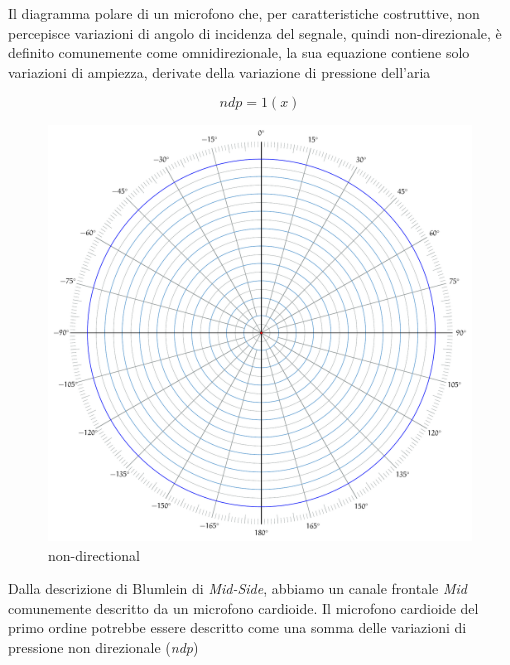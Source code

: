 Il diagramma polare di un microfono che, per caratteristiche costruttive, non
percepisce variazioni di angolo di incidenza del segnale, quindi non-direzionale,
è definito comunemente come omnidirezionale, la sua equazione contiene solo
variazioni di ampiezza, derivate della variazione di pressione dell'aria

\begin{equation}
ndp = 1(x)
\label{eq:omni}
\end{equation}

\begin{figure}[h]
\centering
\includegraphics[width=1\columnwidth]{CAPITOLI/_TIKZ/POLAR/omni}
\caption{non-directional}
\label{polar:omni}
\end{figure}


Dalla descrizione di Blumlein di \emph{Mid-Side}, abbiamo un canale frontale
\emph{Mid} comunemente descritto da un microfono cardioide. Il microfono
cardioide del primo ordine potrebbe essere descritto come una somma delle
variazioni di pressione non direzionale (\emph{ndp})

